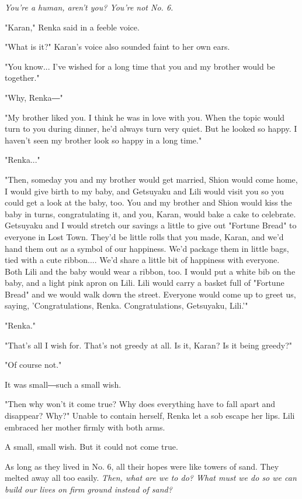\emph{You're a human, aren't you? You're not No. 6.}

"Karan," Renka said in a feeble voice.

"What is it?" Karan's voice also sounded faint to her own ears.

"You know... I've wished for a long time that you and my brother would
be together."

"Why, Renka―"

"My brother liked you. I think he was in love with you. When the topic
would turn to you during dinner, he'd always turn very quiet. But he
looked so happy. I haven't seen my brother look so happy in a long
time."

"Renka..."

"Then, someday you and my brother would get married, Shion would come
home, I would give birth to my baby, and Getsuyaku and Lili would visit
you so you could get a look at the baby, too. You and my brother and
Shion would kiss the baby in turns, congratulating it, and you, Karan,
would bake a cake to celebrate. Getsuyaku and I would stretch our
savings a little to give out "Fortune Bread" to everyone in Lost Town.
They'd be little rolls that you made, Karan, and we'd hand them out as a
symbol of our happiness. We'd package them in little bags, tied with a
cute ribbon.... We'd share a little bit of happiness with everyone. Both
Lili and the baby would wear a ribbon, too. I would put a white bib on
the baby, and a light pink apron on Lili. Lili would carry a basket full
of "Fortune Bread" and we would walk down the street. Everyone would
come up to greet us, saying, 'Congratulations, Renka. Congratulations,
Getsuyaku, Lili.'"

"Renka."

"That's all I wish for. That's not greedy at all. Is it, Karan? Is it
being greedy?"

"Of course not."

It was small―such a small wish.

"Then why won't it come true? Why does everything have to fall apart and
disappear? Why?" Unable to contain herself, Renka let a sob escape her
lips. Lili embraced her mother firmly with both arms.

A small, small wish. But it could not come true.

\mybreak

As long as they lived in No. 6, all their hopes were like towers of
sand. They melted away all too easily. \emph{Then, what are we to do? What
must we do so we can build our lives on firm ground instead of sand?}

